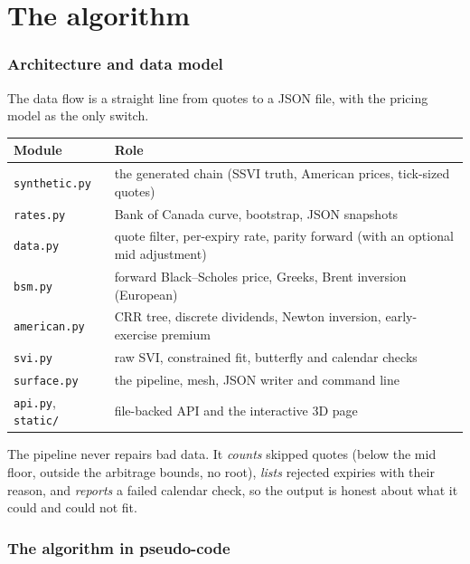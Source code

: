 \documentclass[11pt]{article}
\begin{document}
\part{The algorithm}

\section{Architecture and data model}\label{sec:arch}

The data flow is a straight line from quotes to a JSON file, with the pricing
model as the only switch.

\begin{center}\small
\begin{tabular}{|L{3.4cm}|L{11.2cm}|}
\hline
Module & Role \\ \hline
\texttt{synthetic.py} & the generated chain (SSVI truth, American prices, tick-sized quotes) \\ \hline
\texttt{rates.py} & Bank of Canada curve, bootstrap, JSON snapshots \\ \hline
\texttt{data.py} & quote filter, per-expiry rate, parity forward (with an optional mid adjustment) \\ \hline
\texttt{bsm.py} & forward Black--Scholes price, Greeks, Brent inversion (European) \\ \hline
\texttt{american.py} & CRR tree, discrete dividends, Newton inversion, early-exercise premium \\ \hline
\texttt{svi.py} & raw SVI, constrained fit, butterfly and calendar checks \\ \hline
\texttt{surface.py} & the pipeline, mesh, JSON writer and command line \\ \hline
\texttt{api.py}, \texttt{static/} & file-backed API and the interactive 3D page \\ \hline
\end{tabular}
\end{center}

The pipeline never repairs bad data. It \emph{counts} skipped quotes (below the
mid floor, outside the arbitrage bounds, no root), \emph{lists} rejected expiries
with their reason, and \emph{reports} a failed calendar check, so the output is
honest about what it could and could not fit.

\section{The algorithm in pseudo-code}\label{sec:algo}
\end{document}

